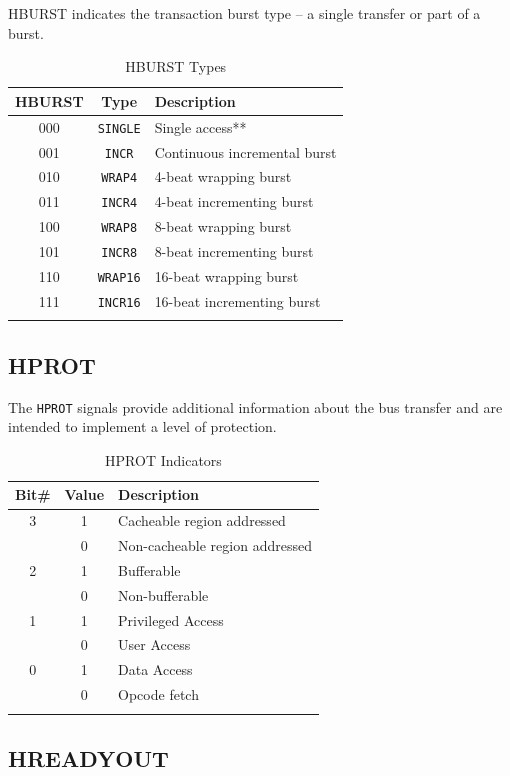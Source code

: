 HBURST indicates the transaction burst type -- a single transfer or part
of a burst.

\begin{longtable}[c]{@{\extracolsep{\fill}}ccl}	
	\toprule 
	\textbf{HBURST} & \textbf{Type} & \textbf{Description}\\
	\midrule
	\endhead 
	000 & \texttt{SINGLE} & Single access**\\
	001 & \texttt{INCR}   & Continuous incremental burst\\
	010 & \texttt{WRAP4}  & 4-beat wrapping burst\\
	011 & \texttt{INCR4}  & 4-beat incrementing burst\\
	100 & \texttt{WRAP8}  & 8-beat wrapping burst\\
	101 & \texttt{INCR8}  & 8-beat incrementing burst\\
	110 & \texttt{WRAP16} & 16-beat wrapping burst\\
	111 & \texttt{INCR16} & 16-beat incrementing burst\\
	\bottomrule 	
	\caption{HBURST Types}
	\label{tab:HBURST}
\end{longtable}

\subsection{HPROT}

The \texttt{HPROT} signals provide additional information about the bus
transfer and are intended to implement a level of protection.

\begin{longtable}[c]{@{}ccl}	
	\toprule 
	\textbf{Bit\#} & \textbf{Value} & \textbf{Description}\\
	\midrule
	\endhead 
	3 & 1 & Cacheable region addressed\\
	& 0 & Non-cacheable region addressed\\
	2 & 1 & Bufferable\\
	& 0 & Non-bufferable\\
	1 & 1 & Privileged Access\\
	& 0 & User Access\\
	0 & 1 & Data Access\\
	& 0 & Opcode fetch\\
	\bottomrule 	
	\caption{HPROT Indicators}
	\label{tab:HPROT}
\end{longtable}


\subsection{HREADYOUT}


